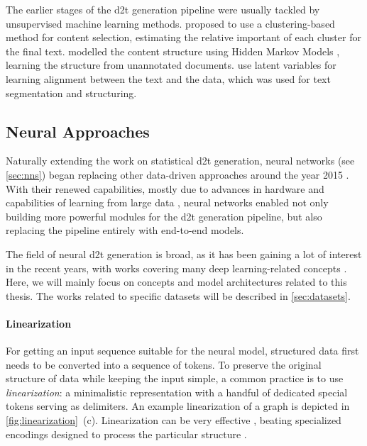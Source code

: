 {The earlier stages of the \ac{d2t} generation pipeline were usually tackled by unsupervised machine learning methods. \citet{duboue2003statistical} proposed to use a clustering-based method for content selection, estimating the relative important of each cluster for the final text. \citet{barzilay2004catching} modelled the content structure using Hidden Markov Models \cite{baum1966statistical}, learning the structure from unannotated documents. \citet{liang2009learning} use latent variables for learning alignment between the text and the data, which was used for text segmentation and structuring.

\subsection{Neural Approaches}
\label{sec:neural-d2t}
Naturally extending the work on statistical \ac{d2t} generation, neural networks (see \autoref{sec:nns}) began replacing other data-driven approaches around the year 2015 \cite{dusekTrainingNaturalLanguage2015,wen2015toward}. With their renewed capabilities, mostly due to advances in hardware \cite{hooker2021hardware} and capabilities of learning from large data \cite{lecun2015deep}, neural networks enabled not only building more powerful modules for the \ac{d2t} generation pipeline, but also replacing the pipeline entirely with end-to-end models.

The field of neural \ac{d2t} generation is broad, as it has been gaining a lot of interest in the recent years, with works covering many deep learning-related concepts \cite{sharmaInnovationsNeuralDatatotext2022, lin2023survey}. Here, we will mainly focus on concepts and model architectures related to this thesis. The works related to specific datasets will be described in \autoref{sec:datasets}.


\paragraph{Linearization} For getting an input sequence suitable for the neural model, structured data first needs to be converted into a sequence of tokens. To preserve the original structure of data while keeping the input simple, a common practice is to use \emph{linearization}: a minimalistic representation with a handful of dedicated special tokens serving as delimiters. An example linearization of a graph is depicted in \autoref{fig:linearization}~(c). Linearization can be very effective \cite{yang2020improving,hoyle2021promoting,xieUnifiedSKGUnifyingMultiTasking2022}, beating specialized encodings designed to process the particular structure \cite{marcheggianiDeepGraphConvolutional2018,koncel-kedziorskiTextGenerationKnowledge2019}.

}
